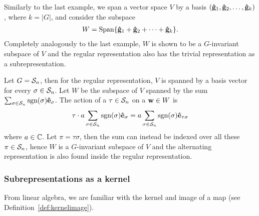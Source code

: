 \begin{example}\cite[Example 1.4.4.]{Sagan}
	Similarly to the last example, we span a vector space $V$ by a basis $(\mathbf{\hat{g}}_1, \mathbf{\hat{g}}_2, \dots, \mathbf{\hat{g}}_{k})$, where $k = |G|$, and consider the subspace 
	\begin{align*}
		W = \text{Span}\{ \mathbf{\hat{g}}_1 + \mathbf{\hat{g}}_2 + \dots + \mathbf{\hat{g}}_k \}. 
	\end{align*}
	Completely analogously to the last example, $W$ is shown to be a $G$-invariant subspace of $V$ and the regular representation also has the trivial representation as a subrepresentation.
\end{example}

\begin{example}\cite[Example 1.4.4.]{Sagan}
	Let $G = \mathcal{S}_n$, then for the regular representation, $V$ is spanned by a basis vector for every $\sigma \in \mathcal{S}_n$. Let $W$ be the subspace of $V$ spanned by the sum $\sum_{\sigma \in \mathcal{S}_n} \text{sgn}(\sigma) \mathbf{\hat{e}}_{\sigma}$. The action of a $\tau \in \mathcal{S}_n$ on a $\mathbf{w} \in W$ is
	\begin{align*}
		\tau \cdot a\sum_{\sigma \in \mathcal{S}_n} \text{sgn}(\sigma) \mathbf{\hat{e}}_{\sigma} = a \sum_{\sigma \in \mathcal{S}_n} \text{sgn}(\sigma) \mathbf{\hat{e}}_{\tau\sigma} 
	\end{align*}
	where $a \in \mathbb{C}$. Let $\pi = \tau\sigma$, then the sum can instead be indexed over all these $\pi \in \mathcal{S}_n$, hence $W$ is a $G$-invariant subspace of $V$ and the alternating representation is also found inside the regular representation.
\end{example}

\subsubsection{Subrepresentations as a kernel}

From linear algebra, we are familiar with the kernel and image of a map (see Definition~\ref{def:kernelimage}).

